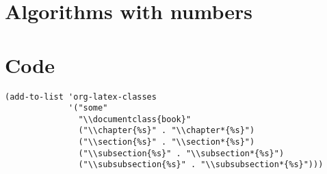 \documentclass{book}
\begin{document}
\chapter{Algorithms with numbers}
\label{sec:orgf565005}
\backmatter
\chapter{Code}
\label{sec:org93f8431}
\begin{verbatim}
(add-to-list 'org-latex-classes
             '("some"
               "\\documentclass{book}"
               ("\\chapter{%s}" . "\\chapter*{%s}")
               ("\\section{%s}" . "\\section*{%s}")
               ("\\subsection{%s}" . "\\subsection*{%s}")
               ("\\subsubsection{%s}" . "\\subsubsection*{%s}")))
\end{verbatim}
\end{document}
